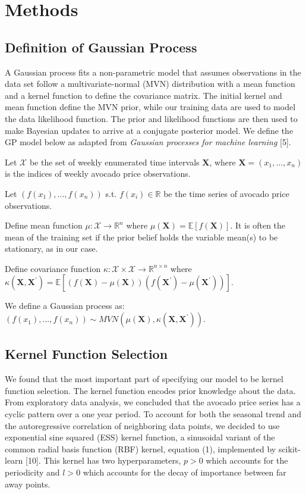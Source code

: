 \documentclass{article}
\begin{document}
\section{Methods}
\subsection{Definition of Gaussian Process}
 A Gaussian process fits a non-parametric model that assumes observations in the data set follow a multivariate-normal (MVN) distribution with a mean function and a kernel function to define the covariance matrix. The initial kernel and mean function define the MVN prior, while our training data are used to model the data likelihood function. The prior and likelihood functions are then used to make Bayesian updates to arrive at a conjugate posterior model. We define the GP model below as adapted from \textit{Gaussian processes for machine learning} [5].

Let $\mathcal{X}$ be the set of weekly enumerated time intervals $\textbf{X}$, where $\textbf{X} = (x_1, ..., x_n)$ is the indices of weekly avocado price observations.

Let $(f(x_1), ..., f(x_n))$ s.t. $f(x_i) \in \mathbb{R}$ be the time series of avocado price observations.

Define mean function $\mu : \mathcal{X} \rightarrow \mathbb{R}^n$ where $\mu(\textbf{X}) = \mathbb{E}[f(\textbf{X})]$. It is often the mean of the training set if the prior belief holds the variable mean(s) to be stationary, as in our case.

Define covariance function $\kappa : \mathcal{X} \times \mathcal{X} \rightarrow \mathbb{R}^{n\times n}$ where $\kappa(\textbf{X}, \textbf{X}^\prime) = \mathbb{E}[(f(\textbf{X}) - \mu(\textbf{X}))(f(\textbf{X}^\prime) - \mu(\textbf{X}^\prime))]$.

We define a Gaussian process as: $(f(x_1), ..., f(x_n)) \sim MVN(\mu(\textbf{X}), \kappa(\textbf{X}, \textbf{X}^\prime))$.

\subsection{Kernel Function Selection}

We found that the most important part of specifying our model to be kernel function selection. The kernel function encodes prior knowledge about the data. From exploratory data analysis, we concluded that the avocado price series has a cyclic pattern over a one year period. To account for both the seasonal trend and the autoregressive correlation of neighboring data points, we decided to use exponential sine squared (ESS) kernel function, a sinusoidal variant of the common radial basis function (RBF) kernel, equation (1), implemented by scikit-learn [10]. This kernel has two hyperparameters, $p > 0$ which accounts for the periodicity and $l > 0$ which accounts for the decay of importance between far away points.
\end{document}
